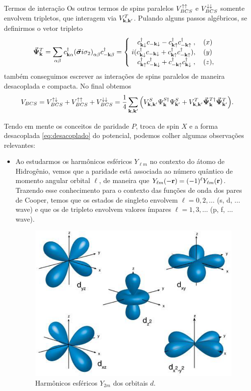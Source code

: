 \documentclass[a4paper,10pt]{article}
\begin{document}
\begin{section}{Termos de interação}
Os outros termos de spins paralelos $V_{BCS}^{\uparrow\uparrow}$ e $V_{BCS}^{\downarrow\downarrow}$ somente envolvem tripletos, que interagem via $V_{\vb{k},\vb{k}'}^T$. Pulando alguns passos algébricos, se definirmos o vetor tripleto
$$
\va*{\Psi}_{\vb{k}}^T = \sum_{\alpha\beta} c_{\vb{k}\alpha}^\dagger \qty(\va*{\sigma} i \sigma_2)_{\alpha\beta} c_{-\vb{k}\beta}^\dagger =
\begin{cases}
\; \; \; \; c_{\vb{k}\downarrow}^\dagger c_{-\vb{k}\downarrow} - c_{\vb{k}\uparrow}^\dagger c_{-\vb{k}\uparrow}^\dagger \; , \quad (x) \\
\; i (c_{\vb{k}\downarrow}^\dagger c_{-\vb{k}\downarrow} + c_{\vb{k}\uparrow}^\dagger c_{-\vb{k}\uparrow}^\dagger), \quad (y) \\
\; \; \; \; c_{\vb{k}\uparrow}^\dagger c_{-\vb{k}\downarrow}^\dagger + c_{-\vb{k}\uparrow}^\dagger c_{\vb{k}\downarrow}^\dagger \; , \quad (z),
\end{cases}
$$
também conseguimos escrever as interações de spins paralelos de maneira desacoplada e compacta. No final obtemos
\begin{equation} \label{eq:desacoplado}
V_{BCS} =
V_{BCS}^{\uparrow\downarrow} + V_{BCS}^{\uparrow\uparrow} + V_{BCS}^{\downarrow\downarrow} =
\frac{1}{4} \sum_{\vb{k},\vb{k}'}
\qty(
V_{\vb{k},\vb{k}'}^S \Psi_{\vb{k}}^{S\dagger} \Psi_{\vb{k}'}^S +
V_{\vb{k},\vb{k}'}^T \va*{\Psi}_{\vb{k}}^{T\dagger} \va*{\Psi}_{\vb{k}'}^T
).
\end{equation}


Tendo em mente os conceitos de paridade $P$, troca de spin $X$ e a forma desacoplada \ref{eq:desacoplado} do potencial, podemos colher algumas observações relevantes:


\begin{itemize}
\item Ao estudarmos os harmônicos esféricos $Y_{\ell m}$ no contexto do átomo de Hidrogênio, vemos que a paridade está associada ao número quântico de momento angular orbital $\ell$, de maneira que $Y_{\ell m}(-\vb{r}) = (-1)^\ell Y_{\ell m}(\vb{r})$. Trazendo esse conhecimento para o contexto das funções de onda dos pares de Cooper, temos que os estados de singleto envolvem $\ell = 0, 2, \ldots$ (s, d, $\ldots$ wave) e que os de tripleto envolvem valores ímpares $\ell = 1, 3, \ldots$ (p, f, $\ldots$ wave).

\begin{figure}[H]
\centering
\includegraphics[width=0.55\linewidth]{fig/d-orbitals.png}
\caption{Harmônicos esféricos $Y_{2m}$ dos orbitais $d$.}
\label{fig:d-orbitals}
\end{figure}


\end{itemize}
\end{section}
\end{document}

